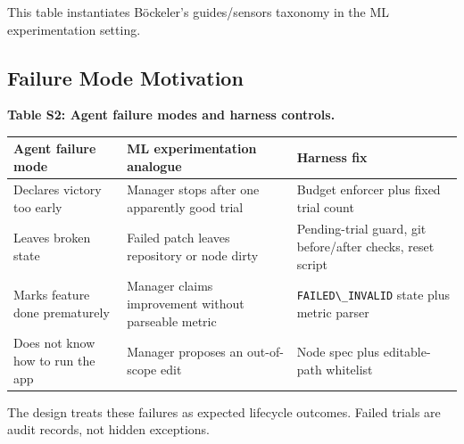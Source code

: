 This table instantiates Böckeler's guides/sensors taxonomy in the ML experimentation setting.

\subsection{Failure Mode Motivation}\label{failure-mode-motivation}

\textbf{Table S2: Agent failure modes and harness controls.}

\begin{table}[t]
\small
\begin{tabular}{@{}
  >{\raggedright\arraybackslash}p{}
  >{\raggedright\arraybackslash}p{}
  >{\raggedright\arraybackslash}p{}@{}}
\toprule
\begin{minipage}[b]{\linewidth}\raggedright
Agent failure mode
\end{minipage} & \begin{minipage}[b]{\linewidth}\raggedright
ML experimentation analogue
\end{minipage} & \begin{minipage}[b]{\linewidth}\raggedright
Harness fix
\end{minipage} \\
\midrule
\bottomrule
Declares victory too early & Manager stops after one apparently good trial & Budget enforcer plus fixed trial count \\
Leaves broken state & Failed patch leaves repository or node dirty & Pending-trial guard, git before/after checks, reset script \\
Marks feature done prematurely & Manager claims improvement without parseable metric & \passthrough{\lstinline!FAILED\_INVALID!} state plus metric parser \\
Does not know how to run the app & Manager proposes an out-of-scope edit & Node spec plus editable-path whitelist \\
\end{tabular}
\end{table}

The design treats these failures as expected lifecycle outcomes. Failed trials are audit records, not hidden exceptions.
